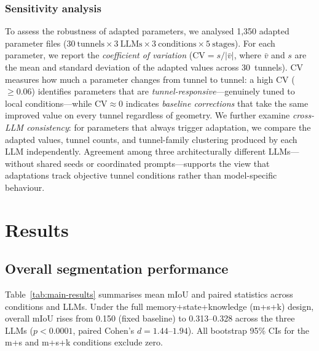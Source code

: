\documentclass[a4paper,fleqn]{cas-dc}
\begin{document}
\subsubsection{Sensitivity analysis}\label{sec:sensitivity-method}

To assess the robustness of adapted parameters, we analysed 1{,}350 adapted parameter files ($30~\text{tunnels} \times 3~\text{LLMs} \times 3~\text{conditions} \times 5~\text{stages}$). For each parameter, we report the \emph{coefficient of variation} ($\text{CV} = s / |\bar{v}|$, where $\bar{v}$ and $s$ are the mean and standard deviation of the adapted values across 30~tunnels). CV measures how much a parameter changes from tunnel to tunnel: a high CV ($\geq 0.06$) identifies parameters that are \emph{tunnel-responsive}---genuinely tuned to local conditions---while $\text{CV} \approx 0$ indicates \emph{baseline corrections} that take the same improved value on every tunnel regardless of geometry. We further examine \emph{cross-LLM consistency}: for parameters that always trigger adaptation, we compare the adapted values, tunnel counts, and tunnel-family clustering produced by each LLM independently. Agreement among three architecturally different LLMs---without shared seeds or coordinated prompts---supports the view that adaptations track objective tunnel conditions rather than model-specific behaviour.



\section{Results}\label{sec:results}

\subsection{Overall segmentation performance}\label{sec:main-results}

Table~\ref{tab:main-results} summarises mean mIoU and paired statistics across conditions and LLMs. Under the full memory+state+knowledge (m+s+k) design, overall mIoU rises from 0.150 (fixed baseline) to 0.313--0.328 across the three LLMs ($p < 0.0001$, paired Cohen's $d = 1.44$--$1.94$). All bootstrap 95\% CIs for the m+s and m+s+k conditions exclude zero.
\end{document}
